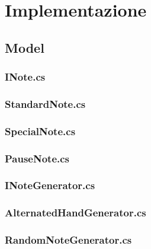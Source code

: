 \section{Implementazione}
\subsection{Model}
\subsubsection{INote.cs}
\newpage
\subsubsection{StandardNote.cs}
\newpage
\subsubsection{SpecialNote.cs}
\newpage
\subsubsection{PauseNote.cs}
\newpage
\subsubsection{INoteGenerator.cs}
\newpage
\subsubsection{AlternatedHandGenerator.cs}
\newpage
\subsubsection{RandomNoteGenerator.cs}
\newpage
